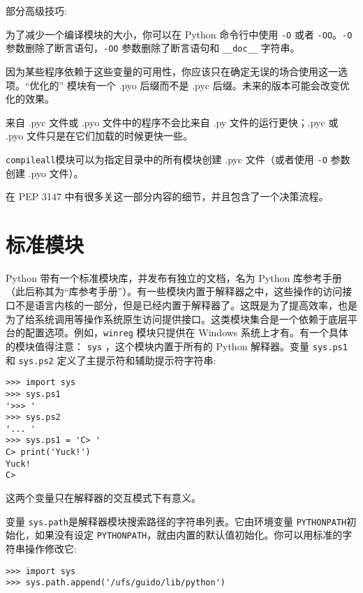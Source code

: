 部分高级技巧:
\begin{compactitem}
    \item 为了减少一个编译模块的大小，你可以在 Python 命令行中使用 \verb|-O| 或者 \verb|-OO|。\verb|-O| 参数删除了断言语句，\verb|-OO| 参数删除了断言语句和 \verb|__doc__| 字符串。

        因为某些程序依赖于这些变量的可用性，你应该只在确定无误的场合使用这一选项。“优化的” 模块有一个 .pyo 后缀而不是 .pyc 后缀。未来的版本可能会改变优化的效果。
    \item 来自 .pyc 文件或 .pyo 文件中的程序不会比来自 .py 文件的运行更快；.pyc 或 .pyo 文件只是在它们加载的时候更快一些。
    \item \texttt{compileall}模块可以为指定目录中的所有模块创建 .pyc 文件（或者使用 \verb|-O| 参数创建 .pyo 文件）。
    \item 在 PEP 3147 中有很多关这一部分内容的细节，并且包含了一个决策流程。
\end{compactitem}
\section{标准模块\label{Modules:StandardModules}}
Python 带有一个标准模块库，并发布有独立的文档，名为 Python 库参考手册（此后称其为“库参考手册”）。有一些模块内置于解释器之中，这些操作的访问接口不是语言内核的一部分，但是已经内置于解释器了。这既是为了提高效率，也是为了给系统调用等操作系统原生访问提供接口。这类模块集合是一个依赖于底层平台的配置选项。例如，\texttt{winreg} 模块只提供在 Windows 系统上才有。有一个具体的模块值得注意： \texttt{sys} ，这个模块内置于所有的 Python 解释器。变量 \texttt{sys.ps1} 和 \texttt{sys.ps2} 定义了主提示符和辅助提示符字符串:
\begin{lstlisting}
>>> import sys
>>> sys.ps1
'>>> '
>>> sys.ps2
'... '
>>> sys.ps1 = 'C> '
C> print('Yuck!')
Yuck!
C>
\end{lstlisting}
这两个变量只在解释器的交互模式下有意义。

变量 \texttt{sys.path}是解释器模块搜索路径的字符串列表。它由环境变量 \texttt{PYTHONPATH}初始化，如果没有设定 \texttt{PYTHONPATH}，就由内置的默认值初始化。你可以用标准的字符串操作修改它:
\begin{lstlisting}
>>> import sys
>>> sys.path.append('/ufs/guido/lib/python')
\end{lstlisting}
